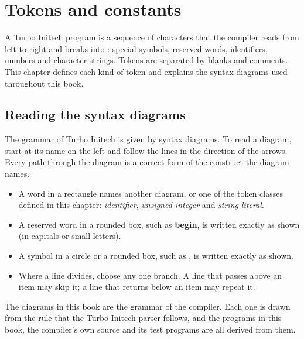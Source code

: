 \chapter{Tokens and constants}

A Turbo Initech program is a sequence of characters that the compiler
reads from left to right and breaks into : special symbols,
reserved words, identifiers, numbers and character strings.  Tokens are
separated by blanks and comments.  This chapter defines each kind of token
and explains the syntax diagrams used throughout this book.

\section{Reading the syntax diagrams}
The grammar of Turbo Initech is given by syntax diagrams.  To read a
diagram, start at its name on the left and follow the lines in the direction
of the arrows.  Every path through the diagram is a correct form of the
construct the diagram names.

\begin{itemize}
\item A word in a rectangle names another diagram, or one of the token
  classes defined in this chapter: \textit{identifier}, \textit{unsigned
  integer} and \textit{string literal}.
\item A reserved word in a rounded box, such as \textbf{begin}, is written
  exactly as shown (in capitals or small letters).
\item A symbol in a circle or a rounded box, such as \code{:=}, is written
  exactly as shown.
\item Where a line divides, choose any one branch.  A line that passes
  above an item may skip it; a line that returns below an item may repeat
  it.
\end{itemize}

The diagrams in this book are the grammar of the compiler.  Each one is
drawn from the rule that the Turbo Initech parser follows, and the
programs in this book, the compiler's own source and its test programs are
all derived from them.


